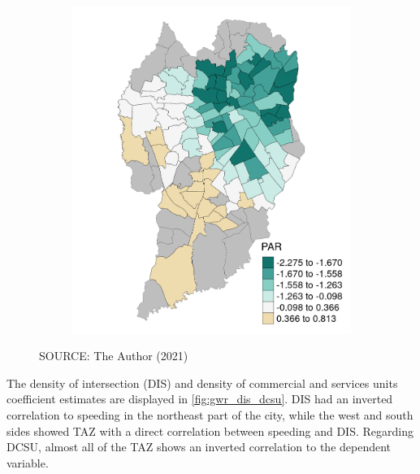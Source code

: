 \begin{figure}[!htbp]
\begin{subfigure}{0.5\textwidth}
        \includegraphics{fig/PAR.png}
    \end{subfigure}    
    \label{fig:gwr_dsc_par}
    \par SOURCE: The Author (2021)
\end{figure}


The density of intersection (DIS) and density of commercial and services units coefficient estimates are displayed in \autoref{fig:gwr_dis_dcsu}. DIS had an inverted correlation to speeding in the northeast part of the city, while the west and south sides showed TAZ with a direct correlation between speeding and DIS. Regarding DCSU, almost all of the TAZ shows an inverted correlation to the dependent variable.  

